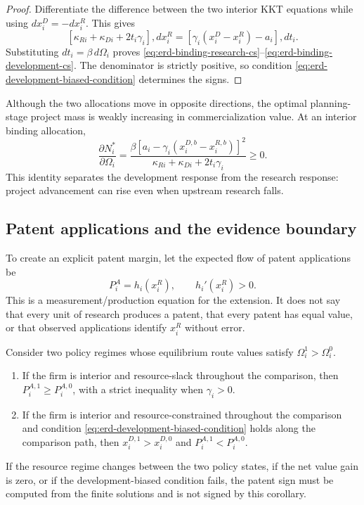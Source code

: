 \begin{proof}
Differentiate the difference between the two interior KKT equations while
using \(dx_i^D=-dx_i^R\). This gives
\[
  [\kappa_{Ri}+\kappa_{Di}+2t_i\gamma_i],dx_i^R
  =
  [\gamma_i(x_i^D-x_i^R)-a_i],dt_i.
\]
Substituting \(dt_i=\beta\,d\Omega_i\) proves
\eqref{eq:erd-binding-research-cs}--\eqref{eq:erd-binding-development-cs}.
The denominator is strictly positive, so condition
\eqref{eq:erd-development-biased-condition} determines the signs.
\end{proof}

Although the two allocations move in opposite directions, the optimal
planning-stage project mass is weakly increasing in commercialization value.
At an interior binding allocation,
\begin{equation}
  \frac{\partial N_i^*}{\partial\Omega_i}
  =
  \frac{\beta[a_i-\gamma_i(x_i^{D,b}-x_i^{R,b})]^2}
       {\kappa_{Ri}+\kappa_{Di}+2t_i\gamma_i}
  \geq0.
  \label{eq:erd-binding-project-mass}
\end{equation}
This identity separates the development response from the research response:
project advancement can rise even when upstream research falls.

\subsection{Patent applications and the evidence boundary}
\label{subsec:erd-patents}

To create an explicit patent margin, let the expected flow of patent
applications be
\begin{equation}
  P_i^A=h_i(x_i^R),
  \qquad h_i'(x_i^R)>0.
  \label{eq:erd-patent-production}
\end{equation}
This is a measurement/production equation for the extension. It does not say
that every unit of research produces a patent, that every patent has equal
value, or that observed applications identify \(x_i^R\) without error.

\begin{extensioncorollary}
\label{cor:erd-patent-sign}
Consider two policy regimes whose equilibrium route values satisfy
\(\Omega_i^1>\Omega_i^0\).

\begin{enumerate}
  \item If the firm is interior and resource-slack throughout the comparison,
  then \(P_i^{A,1}\geq P_i^{A,0}\), with a strict inequality when
  \(\gamma_i>0\).
  \item If the firm is interior and resource-constrained throughout the
  comparison and condition
  \eqref{eq:erd-development-biased-condition} holds along the comparison
  path, then
  \(x_i^{D,1}>x_i^{D,0}\) and \(P_i^{A,1}<P_i^{A,0}\).
\end{enumerate}

If the resource regime changes between the two policy states, if the net
value gain is zero, or if the development-biased condition fails, the patent
sign must be computed from the finite solutions and is not signed by this
corollary.
\end{extensioncorollary}

